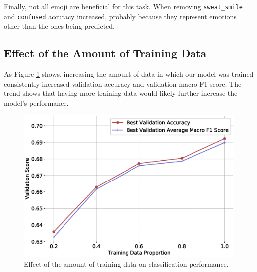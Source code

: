\documentclass[11pt,a4paper]{article}
\begin{document}
Finally, not all emoji are beneficial for this task. When removing
\texttt{sweat\_smile} and \texttt{confused} accuracy increased, probably because
they represent emotions other than the ones being predicted.




\subsection{Effect of the Amount of Training Data}

As Figure \ref{fig:data_amt_vs_acc} shows, increasing the amount of data in
which our model was trained consistently increased validation accuracy and
validation macro F1 score. The trend shows that having more training data would
likely further increase the model's performance.

\begin{figure}[!h]
    \centering
    \includegraphics[width=\columnwidth]{images/acc_vs_tdp_variation.eps}
    \caption{Effect of the amount of training data on classification performance.}
    \label{fig:data_amt_vs_acc}
\end{figure}
\end{document}

